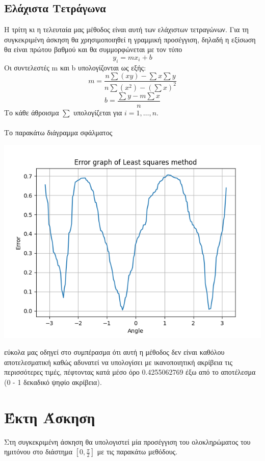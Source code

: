 \documentclass{article}
\begin{document}
\subsection{Ελάχιστα Τετράγωνα}
Η τρίτη κι η τελευταία μας μέθοδος είναι αυτή των ελάχιστων τετραγώνων. Για τη συγκεκριμένη άσκηση θα χρησιμοποιηθεί η γραμμική προσέγγιση, δηλαδή η εξίσωση θα είναι πρώτου βαθμού και θα συμμορφώνεται με τον τύπο
\[
y_i = mx_i + b
\]
Οι συντελεστές m και b υπολογίζονται ως εξής:\\
\[
m = \frac{n\sum(xy) - \sum x \sum y}{n\sum(x^2) - (\sum x)^2}
\]
\[
b = \frac{\sum y - m\sum x}{n}
\]
Το κάθε άθροισμα $\sum$ υπολογίζεται για \( i = 1, \ldots, n \).\\\\
Το παρακάτω διάγραμμα σφάλματος
\begin{center}\includegraphics[width=\linewidth]{ls.png}\end{center}
εύκολα μας οδηγεί στο συμπέρασμα ότι αυτή η μέθοδος δεν είναι καθόλου αποτελεσματική καθώς αδυνατεί να υπολογίσει με ικανοποιητική ακρίβεια τις περισσότερες τιμές, πέφτοντας κατά μέσο όρο 0.4255062769 έξω από το αποτέλεσμα (0 - 1 δεκαδικό ψηφίο ακρίβεια).

\section{Έκτη Άσκηση}
Στη συγκεκριμένη άσκηση θα υπολογιστεί μία προσέγγιση του ολοκληρώματος του ημιτόνου στο διάστημα $[0, \frac{π}{2}]$ με τις παρακάτω μεθόδους.
\end{document}
